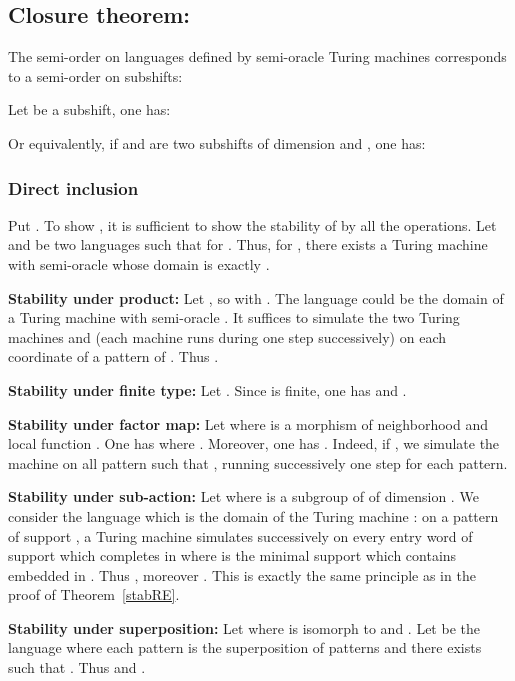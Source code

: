 \documentclass[proceedings]{stacs}
\theoremstyle{plain}\newtheorem{satz}[thm]{Satz}
\theoremstyle{definition}\newtheorem{crucial}[thm]{Crucial Definition}
\begin{document}
	\subsection{Closure theorem: }

The semi-order on languages defined by semi-oracle Turing machines corresponds to a semi-order on  subshifts:

\begin{theorem}\label{EquivalenceOrdre}
Let  be a subshift, one has:

Or equivalently, if  and  are two subshifts of dimension  and , one has:

\end{theorem}





\subsubsection{Direct inclusion} Put . To show , it is sufficient to show the stability of  by all the operations. Let  and  be two languages such that  for . Thus, for , there exists a Turing machine  with semi-oracle  whose domain is exactly .

 \textbf{Stability under product:}
Let , so  with . The language  could be the domain of a Turing machine  with semi-oracle . It suffices to simulate the two Turing machines  and  (each machine runs during one step successively) on each coordinate of a pattern of . Thus .

 \textbf{Stability under finite type:}
Let . Since  is finite, one has  and .

 \textbf{Stability under factor map:} Let  where  is a morphism of neighborhood  and local function . One has  where . Moreover, one has . Indeed, if , we simulate the machine  on all pattern  such that , running successively one step for each pattern. 

 \textbf{Stability under sub-action:} Let  where  is a subgroup of  of dimension . We consider the language  which is the domain of the Turing machine : on a pattern  of support , a Turing machine  simulates successively  on every entry word of support  which completes  in  where  is the minimal support which contains  embedded in . Thus , moreover . This is exactly the same principle as in the proof of Theorem~\ref{stabRE}.

 \textbf{Stability under superposition:} Let  where  is isomorph to  and . Let  be the language where each pattern  is the superposition of patterns  and there exists  such that . Thus  and .
\end{document}
